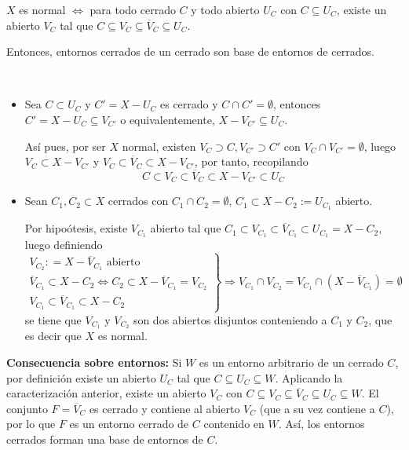 \begin{prop}
    $X$ es normal $\iff$ para todo cerrado $C$ y todo abierto $U_C$ con $C \subseteq U_C$, existe un abierto $V_C$ tal que $C \subseteq V_C \subseteq \overline{V}_C \subseteq U_C$.
    
    Entonces, entornos cerrados de un cerrado son base de entornos de cerrados.
\end{prop}

\begin{dem}\,
    \begin{itemize}
        \item[$\Rightarrow)$] Sea $C\subset U_C$ y $C'=X-U_C$ es cerrado y $C \cap C'=\emptyset$, entonces $C'=X-U_C \subseteq V_{C'}$ o equivalentemente, $X-V_{C'} \subseteq U_C$.
        
        As\'i pues, por ser $X$ normal, existen $V_{C} \supset C, V_{C'}\supset C'$ con $V_C \cap V_{C'} = \emptyset$, luego $V_C \subset X-V_{C'}$ y $V_C \subset \overline{V}_C \subset X-V_{C'}$, por tanto, recopilando
        $$C \subset V_C \subset \overline{V}_C \subset X-V_{C'} \subset U_C$$ 
        \item[$\Leftarrow)$] Sean $C_1, C_2\subset X$ cerrados con $C_1\cap C_2 = \emptyset$, $C_1 \subset X-C_2 := U_{C_1}$ abierto. 
        
        Por hipo\'otesis, existe $V_{C_1}$ abierto tal que $C_1 \subset V_{C_1} \subset \overline{V}_{C_1} \subset U_{C_1} = X-C_2$, luego definiendo
        $$\left. \begin{array}{r}
            V_{C_2} : = X - \overline{V}_{C_1} \text{ abierto} \\ \overline{V}_{C_1} \subset X-C_2 \iff C_2 \subset X-\overline{V}_{C_1} =V_{C_2} \\ V_{C_1} \subset \overline{V}_{C_1} \subset X-C_2
        \end{array} \right\} \Rightarrow V_{C_1} \cap V_{C_2 } = V_{C_1} \cap (X-\overline{V}_{C_1}) = \emptyset$$
        se tiene que $V_{C_1}$ y $V_{C_2}$ son dos abiertos disjuntos conteniendo a $C_1$ y $C_2$, que es decir que $X$ es normal.
    \end{itemize}

    \textbf{Consecuencia sobre entornos:} Si $W$ es un entorno arbitrario de un cerrado $C$, por definición existe un abierto $U_C$ tal que $C \subseteq U_C \subseteq W$. Aplicando la caracterización anterior, existe un abierto $V_C$ con $C \subseteq V_C \subseteq \overline{V}_C \subseteq U_C \subseteq W$. El conjunto $F = \overline{V}_C$ es cerrado y contiene al abierto $V_C$ (que a su vez contiene a $C$), por lo que $F$ es un entorno cerrado de $C$ contenido en $W$. Así, los entornos cerrados forman una base de entornos de $C$.
\end{dem}

